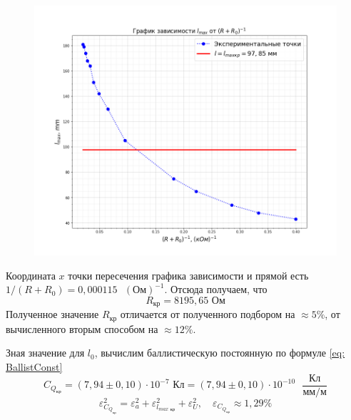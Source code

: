 \documentclass[a4paper,12pt]{article}
\begin{document}
\begin{figure}[H]\label{fig: L_max(R + R0)pow-1}
    \centering
    \includegraphics[width = \textwidth]{l_max(R + R0)pow-1_BallistRejim.png}
\end{figure}
Координата $x$ точки пересечения графика зависимости и прямой есть $1 / (R + R_0) = 0,000115 \text{ } (Ом)^{-1}$. Отсюда получаем, что 
\[R_{кр} = 8195,65 \text{ Ом}\]
Полученное значение $R_{кр}$ отличается от полученного подбором на $\approx 5\%$, от вычисленного вторым способом на $\approx 12\%$.

Зная значение для $l_0$, вычислим баллистическую постоянную по формуле \eqref{eq: BallistConst}
\[C_{Q_{кр}} = (7,94 \pm 0,10) \cdot 10^{-7} \text{ Кл} = (7,94 \pm 0,10) \cdot 10^{-10} \text{ } \frac{Кл}{мм / м}\]
\[\varepsilon_{C_{Q_{кр}}}^2 = \varepsilon_a^2 + \varepsilon_{l_{max \text{ кр}}}^2 + \varepsilon_{U}^2, \quad \varepsilon_{C_{Q_{кр}}} \approx 1,29 \%\]
\end{document}

